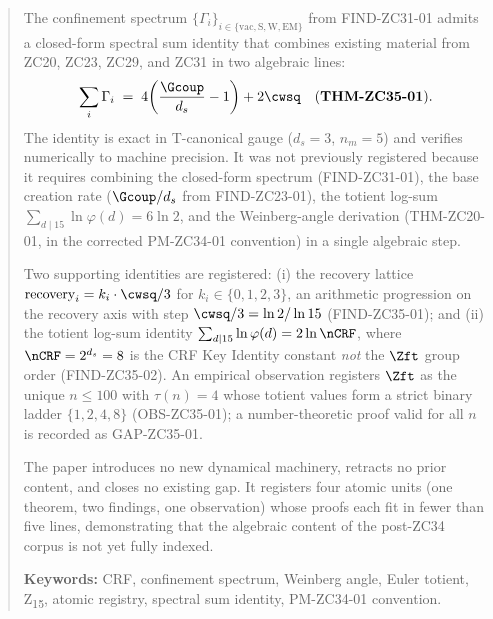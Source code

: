\documentclass[12pt, a4paper]{article}
\begin{document}
\sloppy


\begin{abstract}
\sloppy
The confinement spectrum
$\{\Gamma_i\}_{i \in \{\text{vac},\text{S},\text{W},\text{EM}\}}$
from FIND-ZC31-01 admits a closed-form spectral sum identity that
combines existing material from ZC20, ZC23, ZC29, and ZC31 in two
algebraic lines:
\[
  \sum_{i} \Gamma_i \;=\; 4\!\left(\frac{\Gcoup}{d_s} - 1\right) + 2\cwsq
  \quad \text{(\textbf{THM-ZC35-01})}.
\]
The identity is exact in T-canonical gauge ($d_s = 3$, $n_m = 5$) and
verifies numerically to machine precision. It was not previously
registered because it requires combining the closed-form spectrum
(FIND-ZC31-01), the base creation rate ($\Gcoup/d_s$ from FIND-ZC23-01),
the totient log-sum
$\sum_{d \mid 15} \ln\varphi(d) = 6 \ln 2$, and the Weinberg-angle
derivation (THM-ZC20-01, in the corrected PM-ZC34-01 convention) in
a single algebraic step.

Two supporting identities are registered: (i) the recovery lattice
$\text{recovery}_i = k_i \cdot \cwsq/3$ for $k_i \in \{0,1,2,3\}$, an
arithmetic progression on the recovery axis with step
$\cwsq/3 = \ln 2/\ln 15$ (FIND-ZC35-01); and (ii) the totient
log-sum identity $\sum_{d \mid 15} \ln \varphi(d) = 2 \ln \nCRF$, where
$\nCRF = 2^{d_s} = 8$ is the CRF Key Identity constant
\emph{not} the $\Zft$ group order (FIND-ZC35-02). An empirical
observation registers $\Zft$ as the unique $n \le 100$ with
$\tau(n) = 4$ whose totient values form a strict binary ladder
$\{1,2,4,8\}$ (OBS-ZC35-01); a number-theoretic proof valid for
all $n$ is recorded as GAP-ZC35-01.

The paper introduces no new dynamical machinery, retracts no prior
content, and closes no existing gap. It registers four atomic units
(one theorem, two findings, one observation) whose proofs each fit
in fewer than five lines, demonstrating that the algebraic content
of the post-ZC34 corpus is not yet fully indexed.

\medskip
\noindent\textbf{Keywords:} CRF, confinement spectrum, Weinberg angle,
Euler totient, Z\textsubscript{15}, atomic registry, spectral sum identity,
PM-ZC34-01 convention.
\end{abstract}
\end{document}
